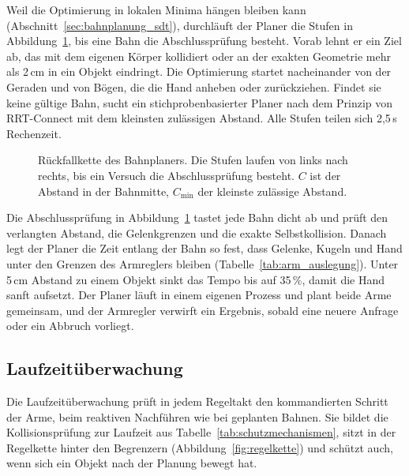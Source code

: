 Weil die Optimierung in lokalen Minima hängen bleiben kann (Abschnitt~\ref{sec:bahnplanung_sdt}), durchläuft der Planer die Stufen in Abbildung~\ref{fig:rueckfallkette}, bis eine Bahn die Abschlussprüfung besteht.
Vorab lehnt er ein Ziel ab, das mit dem eigenen Körper kollidiert oder an der exakten Geometrie mehr als 2\,cm in ein Objekt eindringt.
Die Optimierung startet nacheinander von der Geraden und von Bögen, die die Hand anheben oder zurückziehen.
Findet sie keine gültige Bahn, sucht ein stichprobenbasierter Planer nach dem Prinzip von RRT-Connect \cite{Kuffner2000} mit dem kleinsten zulässigen Abstand.
Alle Stufen teilen sich 2,5\,s Rechenzeit.

\begin{figure}[htbp]
  \centering
  
  \caption[Rückfallkette des Bahnplaners]{Rückfallkette des Bahnplaners. Die Stufen laufen von links nach rechts, bis ein Versuch die Abschlussprüfung besteht. $C$ ist der Abstand in der Bahnmitte, $C_\mathrm{min}$ der kleinste zulässige Abstand.}
  \label{fig:rueckfallkette}
\end{figure}

Die Abschlussprüfung in Abbildung~\ref{fig:rueckfallkette} tastet jede Bahn dicht ab und prüft den verlangten Abstand, die Gelenkgrenzen und die exakte Selbstkollision.
Danach legt der Planer die Zeit entlang der Bahn so fest, dass Gelenke, Kugeln und Hand unter den Grenzen des Armreglers bleiben (Tabelle~\ref{tab:arm_auslegung}).
Unter 5\,cm Abstand zu einem Objekt sinkt das Tempo bis auf 35\,\%, damit die Hand sanft aufsetzt.
Der Planer läuft in einem eigenen Prozess und plant beide Arme gemeinsam, und der Armregler verwirft ein Ergebnis, sobald eine neuere Anfrage oder ein Abbruch vorliegt.

\subsection{Laufzeitüberwachung}
\label{sec:laufzeitueberwachung}
Die Laufzeitüberwachung prüft in jedem Regeltakt den kommandierten Schritt der Arme, beim reaktiven Nachführen wie bei geplanten Bahnen.
Sie bildet die Kollisionsprüfung zur Laufzeit aus Tabelle~\ref{tab:schutzmechanismen}, sitzt in der Regelkette hinter den Begrenzern (Abbildung~\ref{fig:regelkette}) und schützt auch, wenn sich ein Objekt nach der Planung bewegt hat.

